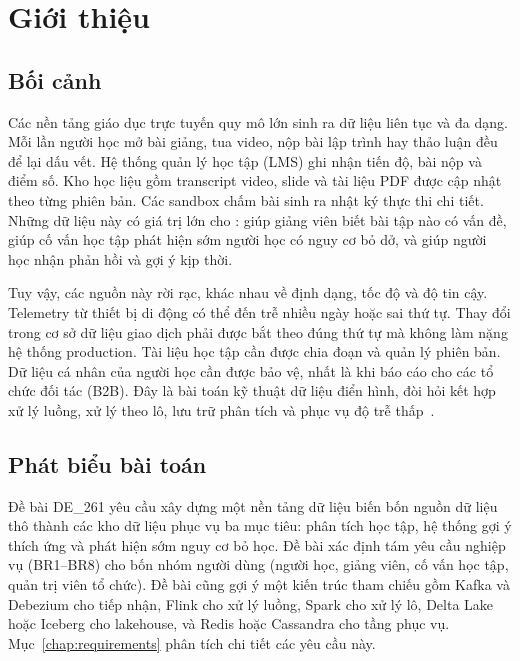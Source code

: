 \section{Giới thiệu}
\label{chap:intro}

\subsection{Bối cảnh}

Các nền tảng giáo dục trực tuyến quy mô lớn sinh ra dữ liệu liên tục và đa dạng. Mỗi lần người học mở bài giảng, tua video, nộp bài lập trình hay thảo luận đều để lại dấu vết. Hệ thống quản lý học tập (LMS) ghi nhận tiến độ, bài nộp và điểm số. Kho học liệu gồm transcript video, slide và tài liệu PDF được cập nhật theo từng phiên bản. Các sandbox chấm bài sinh ra nhật ký thực thi chi tiết. Những dữ liệu này có giá trị lớn cho : giúp giảng viên biết bài tập nào có vấn đề, giúp cố vấn học tập phát hiện sớm người học có nguy cơ bỏ dở, và giúp người học nhận phản hồi và gợi ý kịp thời.

Tuy vậy, các nguồn này rời rạc, khác nhau về định dạng, tốc độ và độ tin cậy. Telemetry từ thiết bị di động có thể đến trễ nhiều ngày hoặc sai thứ tự. Thay đổi trong cơ sở dữ liệu giao dịch phải được bắt theo đúng thứ tự mà không làm nặng hệ thống production. Tài liệu học tập cần được chia đoạn và quản lý phiên bản. Dữ liệu cá nhân của người học cần được bảo vệ, nhất là khi báo cáo cho các tổ chức đối tác (B2B). Đây là bài toán kỹ thuật dữ liệu điển hình, đòi hỏi kết hợp xử lý luồng, xử lý theo lô, lưu trữ phân tích và phục vụ độ trễ thấp~\cite{kleppmann2017}.

\subsection{Phát biểu bài toán}

Đề bài DE\_261 yêu cầu xây dựng một nền tảng dữ liệu biến bốn nguồn dữ liệu thô thành các kho dữ liệu phục vụ ba mục tiêu: phân tích học tập, hệ thống gợi ý thích ứng và phát hiện sớm nguy cơ bỏ học. Đề bài xác định tám yêu cầu nghiệp vụ (BR1--BR8) cho bốn nhóm người dùng (người học, giảng viên, cố vấn học tập, quản trị viên tổ chức). Đề bài cũng gợi ý một kiến trúc tham chiếu gồm Kafka và Debezium cho tiếp nhận, Flink cho xử lý luồng, Spark cho xử lý lô, Delta Lake hoặc Iceberg cho lakehouse, và Redis hoặc Cassandra cho tầng phục vụ. Mục~\ref{chap:requirements} phân tích chi tiết các yêu cầu này.

